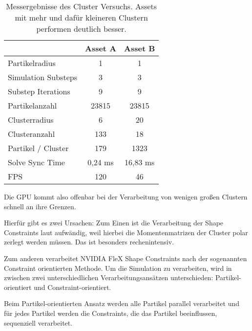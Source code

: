 \begin{table}[hbt!]
\centering
\caption{Messergebnisse des Cluster Versuchs. Assets mit mehr und dafür kleineren Clustern performen deutlich besser.}
\label{table_clusters}
\begin{tabular}{lcc}
                                         & \textbf{Asset A}      & \textbf{Asset B}      \\ \hline
\multicolumn{1}{l|}{Partikelradius}      & 1                     & 1                     \\
\multicolumn{1}{l|}{Simulation Substeps} & 3                     & 3                     \\
\multicolumn{1}{l|}{Substep Iterations}  & 9 					 & 9 				     \\
\multicolumn{1}{l|}{Partikelanzahl}      & 23815                 & 23815                 \\
\multicolumn{1}{l|}{Clusterradius}       & 6                     & 20                    \\
\multicolumn{1}{l|}{Clusteranzahl}       & 133                   & 18                    \\
\multicolumn{1}{l|}{Partikel / Cluster}  & 179                   & 1323                  \\ \hline
\multicolumn{1}{l|}{Solve Sync Time}     & 0,24 ms               & 16,83 ms              \\
\multicolumn{1}{l|}{FPS}                 & 120                   & 46   
\end{tabular}
\end{table}

Die GPU kommt also offenbar bei der Verarbeitung von wenigen großen Clustern schnell an ihre Grenzen.

Hierfür gibt es zwei Ursachen: Zum Einen ist die Verarbeitung der Shape Constraints laut \cite{FlexD3D} aufwändig, weil hierbei die Momentenmatrizen der Cluster polar zerlegt werden müssen. Das ist besonders rechenintensiv.

Zum anderen verarbeitet NVIDIA FleX Shape Constraints nach der sogenannten Constraint orientierten Methode. Um die Simulation zu verarbeiten, wird in \newline \cite{UPP} zwischen zwei unterschiedlichen Verarbeitungsansätzen unterschieden: Partikel-orientiert und Constraint-orientiert. 

Beim Partikel-orientierten Ansatz werden alle Partikel parallel verarbeitet und für jedes Partikel werden die Constraints, die das Partikel beeinflussen, sequenziell verarbeitet. 

